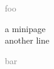 \documentclass{article}
\begin{document}

\noindent
\textcolor{gray}{foo}%
\begin{minipage}{2cm}

a minipage \\
another line

\end{minipage}
\textcolor{gray}{bar}%
\end{document}
